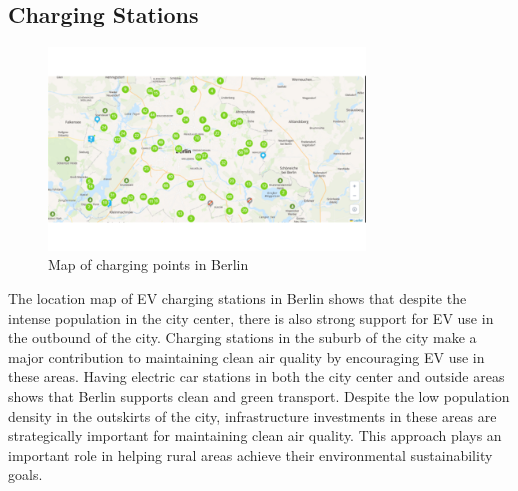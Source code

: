 \subsection{Charging Stations}
\begin{figure}[hbt!]
\begin{center}
\includegraphics[width=0.75\textwidth]{Bilder/kaan2.png}
\caption{Map of charging points in Berlin}\label{fig:kaan2}
\end{center}
\end{figure}
The location map of EV charging stations in Berlin shows that despite the intense population in the city center, there is also strong support for EV use in the outbound of the city. Charging stations in the suburb of the city make a major contribution to maintaining clean air quality by encouraging EV use in these areas. Having electric car stations in both the city center and outside areas shows that Berlin supports clean and green transport. Despite the low population density in the outskirts of the city, infrastructure investments in these areas are strategically important for maintaining clean air quality. This approach plays an important role in helping rural areas achieve their environmental sustainability goals.
